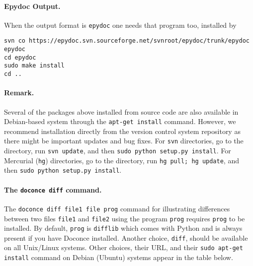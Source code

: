 \documentclass[%
oneside,                 %
final,                   %
10pt]{article}
\begin{document}
\paragraph{Epydoc Output.}
When the output format is {\fontsize{10pt}{10pt}\Verb!epydoc!} one needs that program too, installed
by
\vspace{4pt}
\begin{Verbatim}[numbers=none,frame=lines,label=\fbox{{\tiny Terminal}},fontsize=\fontsize{9pt}{9pt},
labelposition=topline,framesep=2.5mm,framerule=0.7pt]
svn co https://epydoc.svn.sourceforge.net/svnroot/epydoc/trunk/epydoc epydoc
cd epydoc
sudo make install
cd ..
\end{Verbatim}

\paragraph{Remark.}
Several of the packages above installed from source code
are also available in Debian-based system through the
{\fontsize{10pt}{10pt}\Verb!apt-get install!} command. However, we recommend installation directly
from the version control system repository as there might be important
updates and bug fixes. For {\fontsize{10pt}{10pt}\Verb!svn!} directories, go to the directory,
run {\fontsize{10pt}{10pt}\Verb!svn update!}, and then {\fontsize{10pt}{10pt}\Verb!sudo python setup.py install!}. For
Mercurial ({\fontsize{10pt}{10pt}\Verb!hg!}) directories, go to the directory, run
{\fontsize{10pt}{10pt}\Verb!hg pull; hg update!}, and then {\fontsize{10pt}{10pt}\Verb!sudo python setup.py install!}.

\paragraph{The {\fontsize{10pt}{10pt}\protect\Verb!doconce diff!} command.}
The {\fontsize{10pt}{10pt}\Verb!doconce diff file1 file prog!} command for illustrating differences between
two files {\fontsize{10pt}{10pt}\Verb!file1!} and {\fontsize{10pt}{10pt}\Verb!file2!} using the program {\fontsize{10pt}{10pt}\Verb!prog!} requires {\fontsize{10pt}{10pt}\Verb!prog!}
to be installed. By default, {\fontsize{10pt}{10pt}\Verb!prog!} is {\fontsize{10pt}{10pt}\Verb!difflib!} which comes with Python
and is always present if you have Doconce installed. Another choice, {\fontsize{10pt}{10pt}\Verb!diff!},
should be available on all Unix/Linux systems. Other choices, their
URL, and their {\fontsize{10pt}{10pt}\Verb!sudo apt-get install!} command on Debian (Ubuntu) systems
appear in the table below.
\end{document}
